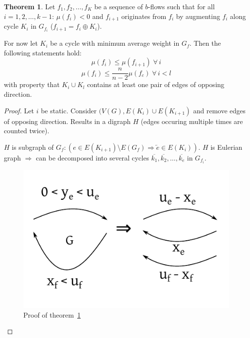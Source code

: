 \documentclass[a4paper]{article}
\theoremstyle{definition}
\newtheorem{theorem}{Theorem}
\newcommand{\fall}{\;\forall\,}
\begin{document}
\begin{theorem}\label{lemma-5.5}
  Let $f_1, f_2, \ldots, f_K$ be a sequence of $b$-flows such that for all $i = 1, 2, \ldots, k-1$:
  $\mu(f_i) < 0$  and $f_{i+1}$ originates from $f_i$ by augmenting $f_i$ along cycle $K_i$ in $G_{f_i}$ ($f_{i+1} = f_i \oplus K_i$).

  For now let $K_i$ be a cycle with minimum average weight in $G_f$. Then the following statements hold:
  \[ \mu(f_i) \leq \mu(f_{i+1}) \fall i \]
  \[ \mu(f_i) \leq \frac{n}{n-2} \mu(f_c) \fall i < l \]
  with property that $K_i \cup K_l$ contains at least one pair of edges of opposing direction.
\end{theorem}

\begin{proof}
  Let $i$ be static. Consider $(V(G), E(K_i) \cup E(K_{i+1})$ and remove edges of opposing direction.
  Results in a digraph $H$ (edges occuring multiple times are counted twice).

  $H$ is subgraph of $G_f: (e \in E(K_{i+1}) \setminus E(G_f) \Rightarrow \overleftarrow{e} \in E(K_i))$.
  $H$ is Eulerian graph $\Rightarrow$ can be decomposed into several cycles $\overline{k_1}, \overline{k_2}, \ldots, \overline{k_e}$ in $G_{f_i}$.

  \begin{figure}[ht]
   \begin{center}
    \includegraphics{img/lemma_5_5.pdf}
    \caption{Proof of theorem~\ref{lemma-5.5}}
   \end{center}
  \end{figure}


\end{proof}
\end{document}
